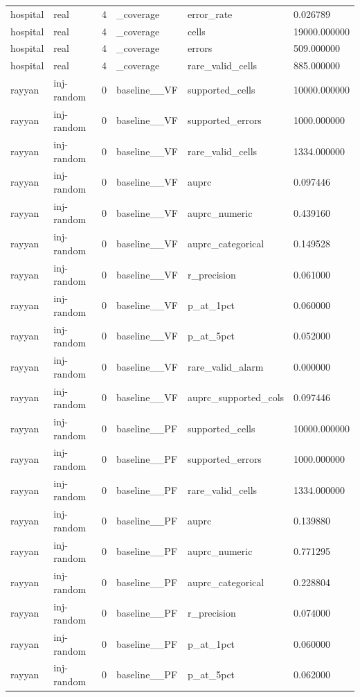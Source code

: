 \begin{tabular}{llllll}
hospital & real & 4 & \_coverage & error\_rate & 0.026789 \\
hospital & real & 4 & \_coverage & cells & 19000.000000 \\
hospital & real & 4 & \_coverage & errors & 509.000000 \\
hospital & real & 4 & \_coverage & rare\_valid\_cells & 885.000000 \\
rayyan & inj-random & 0 & baseline\_\_VF & supported\_cells & 10000.000000 \\
rayyan & inj-random & 0 & baseline\_\_VF & supported\_errors & 1000.000000 \\
rayyan & inj-random & 0 & baseline\_\_VF & rare\_valid\_cells & 1334.000000 \\
rayyan & inj-random & 0 & baseline\_\_VF & auprc & 0.097446 \\
rayyan & inj-random & 0 & baseline\_\_VF & auprc\_numeric & 0.439160 \\
rayyan & inj-random & 0 & baseline\_\_VF & auprc\_categorical & 0.149528 \\
rayyan & inj-random & 0 & baseline\_\_VF & r\_precision & 0.061000 \\
rayyan & inj-random & 0 & baseline\_\_VF & p\_at\_1pct & 0.060000 \\
rayyan & inj-random & 0 & baseline\_\_VF & p\_at\_5pct & 0.052000 \\
rayyan & inj-random & 0 & baseline\_\_VF & rare\_valid\_alarm & 0.000000 \\
rayyan & inj-random & 0 & baseline\_\_VF & auprc\_supported\_cols & 0.097446 \\
rayyan & inj-random & 0 & baseline\_\_PF & supported\_cells & 10000.000000 \\
rayyan & inj-random & 0 & baseline\_\_PF & supported\_errors & 1000.000000 \\
rayyan & inj-random & 0 & baseline\_\_PF & rare\_valid\_cells & 1334.000000 \\
rayyan & inj-random & 0 & baseline\_\_PF & auprc & 0.139880 \\
rayyan & inj-random & 0 & baseline\_\_PF & auprc\_numeric & 0.771295 \\
rayyan & inj-random & 0 & baseline\_\_PF & auprc\_categorical & 0.228804 \\
rayyan & inj-random & 0 & baseline\_\_PF & r\_precision & 0.074000 \\
rayyan & inj-random & 0 & baseline\_\_PF & p\_at\_1pct & 0.060000 \\
rayyan & inj-random & 0 & baseline\_\_PF & p\_at\_5pct & 0.062000 \\

\end{tabular}
